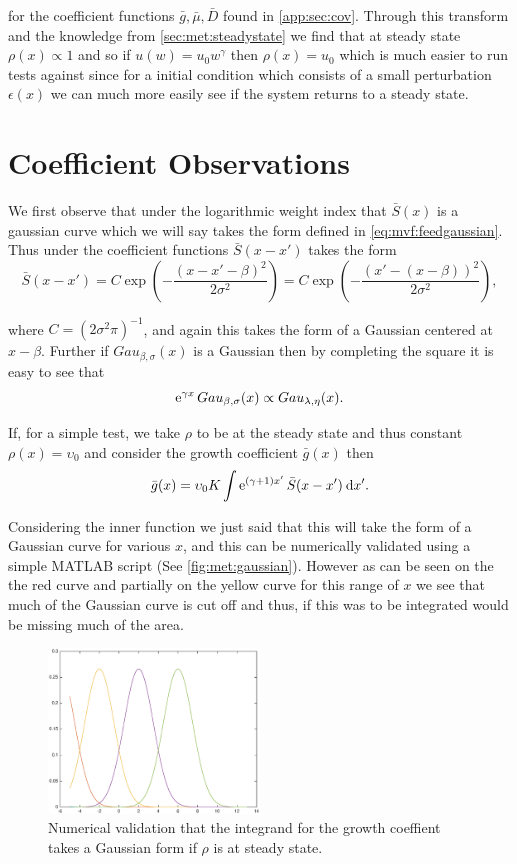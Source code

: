 \documentclass[../main.tex]{subfiles}
\begin{document}
  for the coefficient functions $\bar{g}, \bar{\mu}, \bar{D}$ found in \autoref{app:sec:cov}. Through this transform and the knowledge from \autoref{sec:met:steadystate} we find that at steady state $\rho(x) \propto 1$ and so if $u(w) = u_0 w^{\gamma}$ then $\rho(x) = u_0$ which is much easier to run tests against since for a initial condition which consists of a small perturbation $\epsilon(x)$ we can much more easily see if the system returns to a steady state.

  \section{Coefficient Observations}
  We first observe that under the logarithmic weight index that $\bar{S}(x)$ is a gaussian curve which we will say takes the form defined in \autoref{eq:mvf:feedgaussian}. Thus under the coefficient functions $\bar{S}(x - x')$ takes the form
  \begin{equation}
    \bar{S}(x - x') = C \exp{\left( -\frac{(x - x' - \beta)^2}{2 \sigma^2} \right)} = C \exp{\left( -\frac{(x' - (x - \beta))^2}{2 \sigma^2} \right)},
  \end{equation}

  where $C = (2 \sigma ^2 \pi)^{-1}$, and again this takes the form of a Gaussian centered at $x - \beta$. Further if $Gau_{\beta, \sigma}(x)$ is a Gaussian then by completing the square it is easy to see that
  \begin{equation}
    \operatorname{e}^{\gamma x} Gau_{\beta, \sigma}(x) \propto Gau_{\lambda, \eta}(x).
  \end{equation}

  If, for a simple test, we take $\rho$ to be at the steady state and thus constant $\rho(x) = \upsilon_0$ and consider the growth coefficient $\bar{g}(x)$ then
  \begin{equation}
    \bar{g}(x) = \upsilon_0 K \int \operatorname{e}^{(\gamma + 1) x'} \bar{S}( x - x' ) \: \mathrm{d} x'.
  \end{equation}

  Considering the inner function we just said that this will take the form of a Gaussian curve for various $x$, and this can be numerically validated using a simple MATLAB script (See \autoref{fig:met:gaussian}). However as can be seen on the the red curve and partially on the yellow curve for this range of $x$ we see that much of the Gaussian curve is cut off and thus, if this was to be integrated would be missing much of the area.

  \begin{figure}[ht]
    \centering
    \includegraphics[width=0.5\textwidth]{img/kernelExample.eps}
    \caption{Numerical validation that the integrand for the growth coeffient takes a Gaussian form if $\rho$ is at steady state. \label{fig:met:gaussian}}
  \end{figure}
\end{document}
